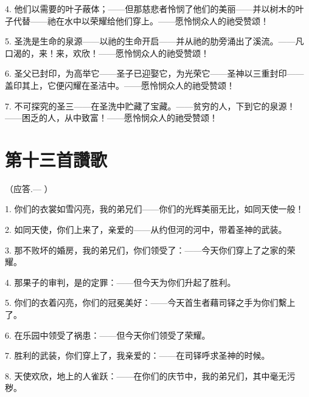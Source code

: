 4. 他们以需要的叶子蔽体；——但那慈悲者怜悯了他们的美丽——并以树木的叶子代替——祂在水中以荣耀给他们穿上。——愿怜悯众人的祂受赞颂！\par

5. 圣洗是生命的泉源——以祂的生命开启——并从祂的肋旁涌出了溪流。——凡口渴的，来！来，欢欣！——愿怜悯众人的祂受赞颂！\par

6. 圣父已封印，为高举它——圣子已迎娶它，为光荣它——圣神以三重封印——盖印其上，它便闪耀在圣洁中。——愿怜悯众人的祂受赞颂！\par

7. 不可探究的圣三——在圣洗中贮藏了宝藏。——贫穷的人，下到它的泉源！——困乏的人，从中致富！——愿怜悯众人的祂受赞颂！\par


\section{第十三首讚歌}

\par

（应答.— ）\par

1. 你们的衣裳如雪闪亮，我的弟兄们——你们的光辉美丽无比，如同天使一般！\par

2. 如同天使，你们上来了，亲爱的——从约但河的河中，带着圣神的武装。\par

3. 那不败坏的婚房，我的弟兄们，你们领受了：——今天你们穿上了之家的荣耀。\par

4. 那果子的审判，是的定罪：——但今天为你们升起了胜利。\par

5. 你们的衣着闪亮，你们的冠冕美好：——今天首生者藉司铎之手为你们繫上了。\par

6. 在乐园中领受了祸患：——但今天你们领受了荣耀。\par

7. 胜利的武装，你们穿上了，我亲爱的：——在司铎呼求圣神的时候。\par

8. 天使欢欣，地上的人雀跃：——在你们的庆节中，我的弟兄们，其中毫无污秽。\par

